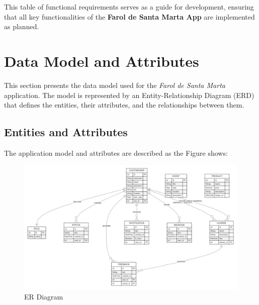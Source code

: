 This table of functional requirements serves as a guide for development, ensuring that all key functionalities of the \textbf{Farol de Santa Marta App} are implemented as planned.

\section{Data Model and Attributes}

This section presents the data model used for the \textit{Farol de Santa Marta} application. The model is represented by an Entity-Relationship Diagram (ERD) that defines the entities, their attributes, and the relationships between them.

\subsection{Entities and Attributes}

The application model and attributes are described as the Figure shows:
\begin{figure}
    \centering
    \includegraphics[width=1\linewidth]{images/er-diagram.png}
    \caption{ER Diagram}
    \label{fig:ER Diagram}
\end{figure}

